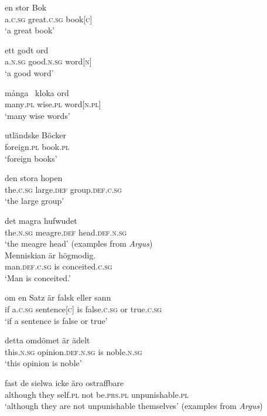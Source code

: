 \documentclass[output=paper]{langscibook}
\begin{document}
\ea\label{ex:intro:35}
\ea\label{ex:intro:35a}
\gll  en       stor           Bok \\
a.\textsc{c.sg}  great.\textsc{c.sg}  book[\textsc{c]}\\
\glt ‘a great book’

\ex\label{ex:intro:35b}
\gll  ett       godt         ord\\
a.\textsc{n.sg}  good.\textsc{n.sg}  word[\textsc{n]}\\
\glt ‘a good word’

\ex\label{ex:intro:35c}
\gll  många~  kloka    ord\\
    many\textsc{.pl}  wise\textsc{.pl}  word[\textsc{n.pl]}\\
    \glt ‘many wise words’

\ex\label{ex:intro:35d}
\gll  utländske   Böcker\\
    foreign.\textsc{pl}  book.\textsc{pl}\\
    \glt  ‘foreign books’

\ex\label{ex:intro:35e}
\gll  den     stora       hopen\\
    the.\textsc{c.sg} large.\textsc{def}   group.\textsc{def.c.sg}\\
\glt    ‘the large group’

\ex\label{ex:intro:35f}
\gll  det       magra       hufwudet\\
    the\textsc{.n.sg} meagre\textsc{.def}    head\textsc{.def.n.sg}\\
\glt    ‘the meagre head’
    (examples from \textit{Argus})\\
\z
\ex \label{ex:intro:36}
\ea \label{ex:intro:36a}
\gll  Menniskian       är högmodig. \\
man.\textsc{def.c.sg}   is   conceited.\textsc{c.sg}\\
\glt ‘Man is conceited.’

\ex \label{ex:intro:36b}
\gll  om   en       Satz       är   falsk       eller   sann\\
    if     a.\textsc{c.sg}     sentence[\textsc{c}] is   false.\textsc{c.sg}   or     true\textsc{.c.sg}\\
\glt `if a sentence is false or true’

\ex \label{ex:intro:36c}
\gll  detta       omdömet         är ädelt\\
    this.\textsc{n.sg}   opinion\textsc{.def.n.sg}    is noble\textsc{.n.sg}\\
\glt `this opinion is noble’

\ex \label{ex:intro:36d}
\gll  fast       de   sielwa   icke   äro       ostraffbare\\
    although   they   self.\textsc{pl}   not   be\textsc{.prs.pl}  unpunishable.\textsc{pl}\\
\glt `although they are not unpunishable themselves’ (examples from \textit{Argus})
\z
\z
\end{document}

